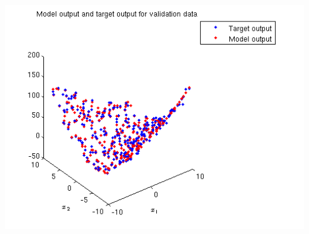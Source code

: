 \documentclass{article}
\begin{document}
\begin{center}
\includegraphics[scale=.6]{Regression/bivar/eps/plot_val}
\end{center}
\end{document}
